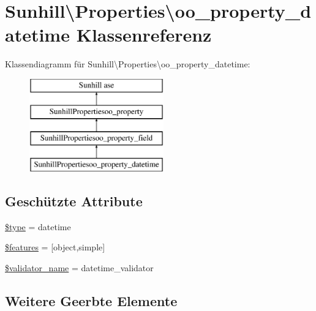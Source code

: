 \hypertarget{classSunhill_1_1Properties_1_1oo__property__datetime}{}\section{Sunhill\textbackslash{}Properties\textbackslash{}oo\+\_\+property\+\_\+datetime Klassenreferenz}
\label{classSunhill_1_1Properties_1_1oo__property__datetime}
Klassendiagramm für Sunhill\textbackslash{}Properties\textbackslash{}oo\+\_\+property\+\_\+datetime\+:\begin{figure}[H]
\begin{center}
\leavevmode
\includegraphics[height=4.000000cm]{dd/d41/classSunhill_1_1Properties_1_1oo__property__datetime}
\end{center}
\end{figure}
\subsection*{Geschützte Attribute}
\begin{DoxyCompactItemize}
\item 
\hyperlink{classSunhill_1_1Properties_1_1oo__property__datetime_a2947b87a3f5ca94bdc2acf0a20f85da0}{\$type} = \textquotesingle{}datetime\textquotesingle{}
\item 
\hyperlink{classSunhill_1_1Properties_1_1oo__property__datetime_ac2cb77934c65ebb06c9360c154f216a9}{\$features} = \mbox{[}\textquotesingle{}object\textquotesingle{},\textquotesingle{}simple\textquotesingle{}\mbox{]}
\item 
\hyperlink{classSunhill_1_1Properties_1_1oo__property__datetime_a0f45a83e75f95d8f8a005cce7e27a680}{\$validator\+\_\+name} = \textquotesingle{}datetime\+\_\+validator\textquotesingle{}
\end{DoxyCompactItemize}
\subsection*{Weitere Geerbte Elemente}


